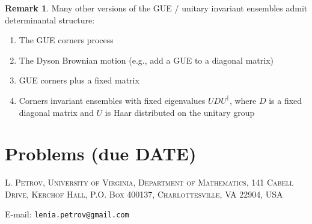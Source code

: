 \documentclass[letterpaper,11pt,oneside,reqno]{article}
\numberwithin{equation}{section}
\theoremstyle{definition}
\newtheorem{remark}[proposition]{Remark}
\begin{document}
\begin{remark}
Many other versions of the GUE / unitary invariant ensembles admit determinantal structure:
\begin{enumerate}
	\item The GUE corners process \cite{johansson2006eigenvalues}
    \item The Dyson Brownian motion (e.g., add a GUE to a diagonal matrix)
			\cite{nagao1998multilevel}
		\item GUE corners plus a fixed matrix \cite{Ferrari2014PerturbedGUE}
    \item Corners invariant ensembles with fixed eigenvalues $UDU^\dagger$, where $D$ is a fixed diagonal matrix and $U$ is Haar distributed
			on the unitary group \cite{Metcalfe2011GT}
	\end{enumerate}
\end{remark}























\appendix
\setcounter{section}{5}

\section{Problems (due DATE)}









\medskip

\textsc{L. Petrov, University of Virginia, Department of Mathematics, 141 Cabell Drive, Kerchof Hall, P.O. Box 400137, Charlottesville, VA 22904, USA}

E-mail: \texttt{lenia.petrov@gmail.com}
\end{document}
